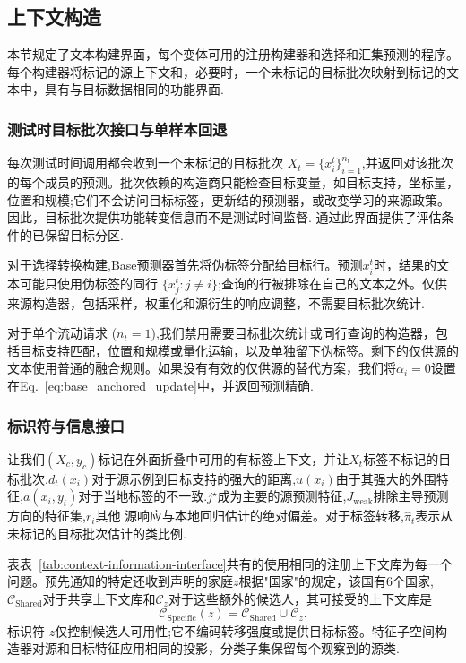 \subsection{上下文构造}
\label{app:context_construction}

本节规定了文本构建界面，每个变体可用的注册构建器和选择和汇集预测的程序。每个构建器将标记的源上下文和，必要时，一个未标记的目标批次映射到标记的文本中，具有与目标数据相同的功能界面.

\subsubsection{测试时目标批次接口与单样本回退}
\label{app:test_time_batch_interface}

每次测试时间调用都会收到一个未标记的目标批次 $X_t=\{x_i^t\}_{i=1}^{n_t}$,并返回对该批次的每个成员的预测。批次依赖的构造商只能检查目标变量，如目标支持，坐标量，位置和规模;它们不会访问目标标签，更新结的预测器，或改变学习的来源政策。因此，目标批次提供功能转变信息而不是测试时间监督.
通过此界面提供了评估条件的已保留目标分区.

对于选择转换构建,Base预测器首先将伪标签分配给目标行。预测$x_i^t$时，结果的文本可能只使用伪标签的同行 $\{x_j^t:j\ne i\}$;查询的行被排除在自己的文本之外。仅供来源构造器，包括采样，权重化和源衍生的响应调整，不需要目标批次统计.

对于单个流动请求 ($n_t=1$),我们禁用需要目标批次统计或同行查询的构造器，包括目标支持匹配，位置和规模或量化运输，以及单独留下伪标签。剩下的仅供源的文本使用普通的融合规则。如果没有有效的仅供源的替代方案，我们将$\alpha_i=0$设置在Eq.~\eqref{eq:base_anchored_update}中，并返回预测精确.



\iffalse
\subsubsection{标识符与信息接口}

让我们$(X_c,y_c)$标记在外面折叠中可用的有标签上下文，并让$X_t$标签不标记的目标批次.$d_t(x_i)$对于源示例到目标支持的强大的距离,$u(x_i)$由于其强大的外围特征,$a(x_i,y_i)$对于当地标签的不一致.$j^\star$成为主要的源预测特征,$J_{\mathrm{weak}}$排除主导预测方向的特征集,$r_i$其他
源响应与本地回归估计的绝对偏差。对于标签转移,$\hat\pi_t$表示从未标记的目标批次估计的类比例.

表表~\ref{tab:context-information-interface}共有的使用相同的注册上下文库为每一个问题。预先通知的特定还收到声明的家庭$z$根据"国家"的规定，该国有6个国家,$\mathcal C_{\mathrm{Shared}}$对于共享上下文库和$\mathcal C_z$对于这些额外的候选人，其可接受的上下文库是
\begin{equation}
  \mathcal C_{\mathrm{Specific}}(z)
  =\mathcal C_{\mathrm{Shared}}\cup\mathcal C_z.
  \label{eq:specific-context-bank}
\end{equation}
标识符 $z$仅控制候选人可用性;它不编码转移强度或提供目标标签。特征子空间构造器对源和目标特征应用相同的投影，分类子集保留每个观察到的源类.


